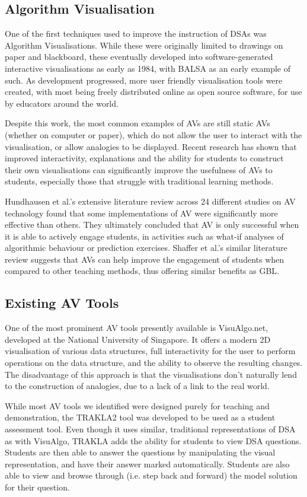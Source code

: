 \documentclass[11pt]{article}
\begin{document}
\subsection{Algorithm Visualisation}
One of the first techniques used to improve the instruction of DSAs was Algorithm Visualisations. While these were originally limited to drawings on paper and blackboard, these eventually developed into software-generated interactive visualisations as early as 1984, with BALSA\cite{Brown:1984:SAA:964965.808596} as an early example of such. As development progressed, more user friendly visualisation tools were created, with most being freely distributed online as open source software, for use by educators around the world.\par
Despite this work, the most common examples of AVs are still static AVs (whether on computer or paper), which do not allow the user to interact with the visualisation, or allow analogies to be displayed. Recent research has shown that improved interactivity, explanations and the ability for students to construct their own visualisations can significantly improve the usefulness of AVs to students, especially those that struggle with traditional learning methods\cite{vegh2}\cite{Stasko:1993:AAA:169059.169078}.\par
Hundhausen et al.'s extensive literature review across 24 different studies on AV technology found that some implementations of AV were significantly more effective than others\cite{metaStudy}. They ultimately concluded that AV is only successful when it is able to actively engage students, in activities such as what-if analyses of algorithmic behaviour or prediction exercises. Shaffer et al.'s similar literature review suggests that AVs can help improve the engagement of students when compared to other teaching methods, thus offering similar benefits as GBL\cite{Shaffer:2010:AVS:1821996.1821997}.
\subsection{Existing AV Tools}
One of the most prominent AV tools presently available is VisuAlgo.net\cite{visualgo}, developed at the National University of Singapore. It offers a modern 2D visualisation of various data structures, full interactivity for the user to perform operations on the data structure, and the ability to observe the resulting changes. The disadvantage of this approach is that the visualisations don't naturally lend to the construction of analogies, due to a lack of a link to the real world.\par
While most AV tools we identified were designed purely for teaching and demonstration, the TRAKLA2\cite{TRAKLA2} tool was developed to be used as a student assessment tool. Even though it uses similar, traditional representations of DSA as with VisuAlgo, TRAKLA adds the ability for students to view DSA questions. Students are then able to answer the questions by manipulating the visual representation, and have their answer marked automatically. Students are also able to view and browse through (i.e. step back and forward) the model solution for their question.
\end{document}

